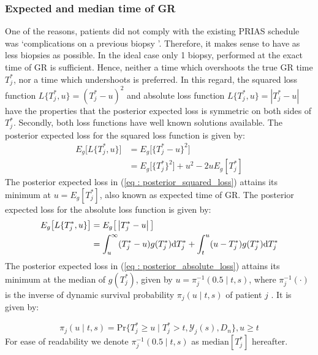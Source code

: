 \subsubsection{Expected and median time of GR}
\label{subsubsec : exp_median_fail_time}
One of the reasons, patients did not comply with the existing PRIAS schedule was \textquoteleft complications on a previous biopsy \textquoteright. Therefore, it makes sense to have as less biopsies as possible. In the ideal case only 1 biopsy, performed at the exact time of GR is sufficient. Hence, neither a time which overshoots the true GR time $T^*_j$, nor a time which undershoots is preferred. In this regard, the squared loss function $L\{T^*_j, u\} = (T^*_j - u)^2$ and absolute loss function $L\{T^*_j, u\} = \left|{T^*_j - u}\right|$ have the properties that the posterior expected loss is symmetric on both sides of $T^*_j$. Secondly, both loss functions have well known solutions available. The posterior expected loss for the squared loss function is given by:
\begin{equation}
\label{eq : posterior_squared_loss}
\begin{split}
E_g\big[L\{T^*_j, u\}\big] &= E_g\big[\{T^*_j - u\}^2\big]\\
&=E_g\big[\{T^*_j\}^2\big] + u^2 -2uE_g[T^*_j]
\end{split}
\end{equation}
The posterior expected loss in (\ref{eq : posterior_squared_loss}) attains its minimum at $u = E_g[T^*_j]$, also known as expected time of GR. The posterior expected loss for the absolute loss function is given by:
\begin{equation}
\label{eq : posterior_absolute_loss}
\begin{split}
E_g\big[L\{T^*_j, u\}\big] &= E_g\big[\left|{T^*_j - u}\right|\big]\\
&= \int_u^\infty (T^*_j - u) g(T^*_j)\rmn{d} T^*_j + \int_t^u (u - T^*_j) g(T^*_j)\rmn{d} T^*_j
\end{split}
\end{equation}
The posterior expected loss in (\ref{eq : posterior_absolute_loss}) attains its minimum at the median of $g(T^*_j)$, given by $u = \pi_j^{-1}(0.5 \mid t,s)$, where $\pi_j^{-1}(\cdot)$ is the inverse of dynamic survival probability $\pi_j(u \mid t, s)$ of patient $j$ \citep{rizopoulos2011dynamic}. It is given by:

\begin{equation}
\label{eq : dynamic_surv_prob}
\pi_j(u \mid t, s) = \mbox{Pr}\big\{T^*_j \geq u \mid  T^*_j >t, \mathcal{Y}_j(s), D_n\big\}, u \geq t
\end{equation}
For ease of readability we denote $\pi_j^{-1}(0.5 \mid t,s)$ as $\mbox{median}[T^*_j]$ hereafter.

